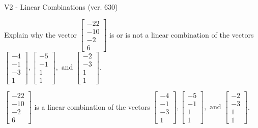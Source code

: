 \begin{exercise}
  \begin{exerciseTitle}V2 - Linear Combinations (ver. 630)\end{exerciseTitle}
  \begin{exerciseStatement}
    Explain why the vector \(\left[\begin{array}{c}
-22 \\
-10 \\
-2 \\
6
\end{array}\right]\)  is or is not a linear 
	combination of the vectors \(\left[\begin{array}{c}
-4 \\
-1 \\
-3 \\
1
\end{array}\right] , \left[\begin{array}{c}
-5 \\
-1 \\
1 \\
1
\end{array}\right] , \text{ and } \left[\begin{array}{c}
-2 \\
-3 \\
1 \\
1
\end{array}\right]\).
	


  \end{exerciseStatement}
  \begin{exerciseAnswer}
   \(\left[\begin{array}{c}
-22 \\
-10 \\
-2 \\
6
\end{array}\right]\) 
  	 is  
	a linear combination of the vectors \(\left[\begin{array}{c}
-4 \\
-1 \\
-3 \\
1
\end{array}\right] , \left[\begin{array}{c}
-5 \\
-1 \\
1 \\
1
\end{array}\right] , \text{ and } \left[\begin{array}{c}
-2 \\
-3 \\
1 \\
1
\end{array}\right]\).

	
  


  \end{exerciseAnswer}
\end{exercise}